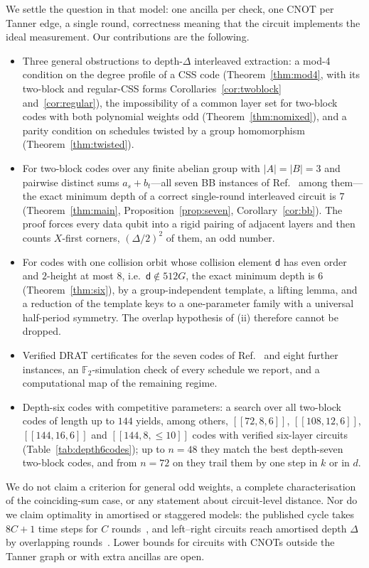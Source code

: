 \documentclass[reprint,twocolumn,superscriptaddress,nofootinbib]{revtex4-2}
\theoremstyle{plain}
\newcommand{\F}{\mathbb{F}_2}
\newcommand{\col}{\mathsf{d}}          %
\begin{document}
We settle the question in that model: one ancilla per check, one CNOT per
Tanner edge, a single round, correctness meaning that the circuit
implements the ideal measurement. Our contributions are the following.
\begin{itemize}[leftmargin=*, itemsep=1pt, topsep=2pt]
\item[(i)] Three general obstructions to depth-$\Delta$ interleaved
extraction: a mod-4 condition on the degree profile of a CSS code
(Theorem~\ref{thm:mod4}, with its two-block and regular-CSS forms
Corollaries~\ref{cor:twoblock} and~\ref{cor:regular}), the impossibility of
a common layer set for two-block codes with both polynomial weights odd
(Theorem~\ref{thm:nomixed}), and a parity
condition on schedules twisted by a group homomorphism
(Theorem~\ref{thm:twisted}).
\item[(ii)] For two-block codes over any finite abelian group with
$|A|=|B|=3$ and pairwise distinct sums $a_s+b_t$---all seven BB instances
of Ref.~\cite{Bravyi2024} among them---the exact minimum depth of a correct
single-round interleaved circuit is $7$ (Theorem~\ref{thm:main},
Proposition~\ref{prop:seven}, Corollary~\ref{cor:bb}). The proof forces
every data qubit into a rigid pairing of adjacent layers and then counts
$X$-first corners, $(\Delta/2)^2$ of them, an odd number.
\item[(iii)] For codes with one collision orbit whose collision element
$\col$ has even order and $2$-height at most $8$, i.e.\ $\col\notin512G$,
the exact minimum depth is $6$ (Theorem~\ref{thm:six}), by a
group-independent template, a lifting lemma, and a reduction of the
template keys to a one-parameter family with a universal half-period
symmetry. The overlap hypothesis of (ii) therefore cannot be dropped.
\item[(iv)] Verified DRAT certificates for the seven codes of
Ref.~\cite{Bravyi2024} and eight further instances, an $\F$-simulation
check of every schedule we report, and a computational map of the
remaining regime.
\item[(v)] Depth-six codes with competitive parameters: a search over all
two-block codes of length up to $144$ yields, among others, $[[72,8,6]]$,
$[[108,12,6]]$, $[[144,16,6]]$ and $[[144,8,\le10]]$ codes with verified
six-layer circuits (Table~\ref{tab:depth6codes}); up to $n=48$ they match
the best depth-seven two-block codes, and from $n=72$ on they trail them by
one step in $k$ or in $d$.
\end{itemize}
We do not claim a criterion for general odd weights, a complete
characterisation of the coinciding-sum case, or any statement about
circuit-level distance. Nor do we claim optimality in amortised or
staggered models: the published cycle takes $8C+1$ time steps for $C$
rounds~\cite{Yoder2025}, and left--right circuits reach amortised depth
$\Delta$ by overlapping rounds~\cite{Strikis2026}. Lower bounds for
circuits with CNOTs outside the Tanner graph or with extra ancillas are
open.
\end{document}
